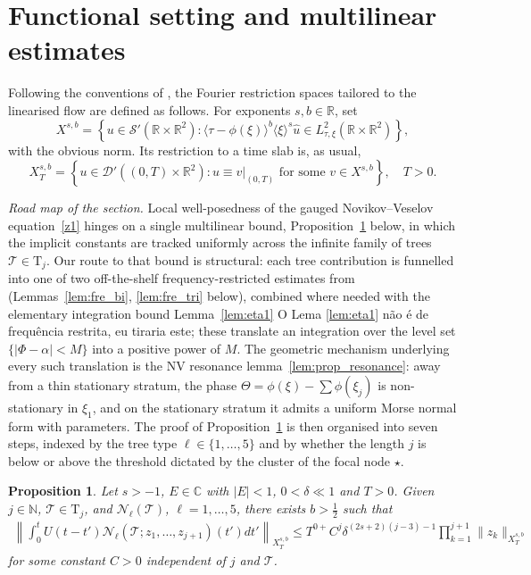 \documentclass[a4paper,
11pt,  reqno]{amsart}
\newcommand{\blue}{\color{blue}}
\newcommand{\orange}{\color{orange}}
\newcommand{\jap}[1]{\langle #1 \rangle}
\newcommand{\5}{\textup{V}}
\newcommand{\noi}{\noindent}
\newtheorem{proposition}[theorem]{Proposition}
\theoremstyle{remark}
\newcommand{\R}{\mathbb{R}}
\newcommand{\CC}{\mathbb{C}}
\newcommand{\TT}{\mathcal{T}}
\newcommand{\Tr}{\mathrm{T}}
\renewcommand{\l}{\ell}
\renewcommand{\S}{\mathcal{S}}
\newcommand{\N}{\mathbb{N}}
\numberwithin{equation}{section}
\numberwithin{theorem}{section}
\newcommand{\Ncal}{\mathcal{N}}
\begin{document}
\section{Functional setting and multilinear estimates}\label{sec:multi}

Following the conventions of \cite{bourg1, bourg2, tao_book}, the Fourier restriction spaces tailored to the linearised flow are defined as follows. For exponents $s,b\in\R$, set
\begin{equation}
X^{s,b}=\left\{ u\in \S'(\R\times \R^2) : \jap{\tau-\phi(\xi)}^b\jap{\xi}^s  \widehat{u}\in L^2_{\tau,\xi}(\R\times \R^2)\right\},
\end{equation}
with the obvious norm. Its restriction to a time slab is, as usual,
\begin{equation}
X^{s,b}_T=\left\{ u\in \mathcal{D}'((0,T)\times \R^2) : u\equiv v\big|_{(0,T)}\mbox{ for some }v\in X^{s,b}  \right\},\quad T>0.
\end{equation}

\medskip

\noi\textit{Road map of the section.} Local well-posedness of the gauged Novikov--Veselov equation~\eqref{z1} hinges on a single multilinear bound, Proposition~\ref{prop:bourgL2} below, in which the implicit constants are tracked uniformly across the infinite family of trees $\TT\in\Tr_j$. Our route to that bound is structural: each tree contribution is funnelled into {\orange one of two off-the-shelf frequency-restricted estimates from~\cite{CLS, COS} (Lemmas~\ref{lem:fre_bi}, \ref{lem:fre_tri} below), combined where needed with the elementary integration bound Lemma~\ref{lem:eta1}} {\blue O Lema \ref{lem:eta1} não é de frequência restrita, eu tiraria este}{\orange ; these translate an integration over the level set $\{|\Phi-\alpha|<M\}$ into a positive power of $M$.} The geometric mechanism underlying every such translation is the NV resonance lemma~\ref{lem:prop_resonance}: away from a thin stationary stratum, the phase $\Theta=\phi(\xi)-\sum\phi(\xi_j)$ is non-stationary in $\xi_1$, and on the stationary stratum it admits a uniform Morse normal form with parameters. The proof of Proposition~\ref{prop:bourgL2} is then organised into seven steps, indexed by the tree type $\ell\in\{1,\dots,5\}$ and by whether the length $j$ is below or above the threshold dictated by the cluster of the focal node $\star$.

\begin{proposition}\label{prop:bourgL2}
Let $s>-1$, $E\in\CC$ with $|E|<1$, $0<\delta\ll 1$ and $T>0$. Given $j \in\N$, $\TT \in \Tr_j$, and $\Ncal_\l(\TT)$, $\l=1,\dots,5$, there exists $b>\frac12$ such that
	\begin{align}\label{eq:bourg_bi_l2}
		\left\|\int_0^t U(t-t') \Ncal_\l(\TT; z_1,\dots, z_{j+1})(t') dt'  \right\|_{X^{s,b}_T}  \le T^{0+} C^j\delta^{(2s+2)(j-3)-1}\prod_{k=1}^{j+1}\|z_k\|_{X^{s,b}_T}
	\end{align}
    for some constant $C>0$ independent of $j$ and $\TT$.
\end{proposition}
\end{document}
